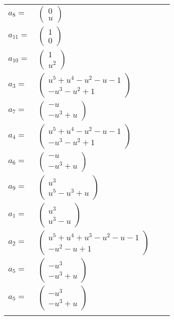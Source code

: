 \documentclass[1p]{elsarticle_modified}
\theoremstyle{definition}
\begin{document}
\begin{tabular}{m{7pt} m{180pt} m{7pt} m{180pt} }
\flushright $a_{8}=$&$\begin{pmatrix}0\\u\end{pmatrix}$ \\
\flushright $a_{11}=$&$\begin{pmatrix}1\\0\end{pmatrix}$ \\
\flushright $a_{10}=$&$\begin{pmatrix}1\\u^2\end{pmatrix}$ \\
\flushright $a_{3}=$&$\begin{pmatrix}u^5+u^4- u^2- u-1\\- u^3- u^2+1\end{pmatrix}$ \\
\flushright $a_{7}=$&$\begin{pmatrix}- u\\- u^3+u\end{pmatrix}$ \\
\flushright $a_{4}=$&$\begin{pmatrix}u^5+u^4- u^2- u-1\\- u^3- u^2+1\end{pmatrix}$ \\
\flushright $a_{6}=$&$\begin{pmatrix}- u\\- u^3+u\end{pmatrix}$ \\
\flushright $a_{9}=$&$\begin{pmatrix}u^3\\u^5- u^3+u\end{pmatrix}$ \\
\flushright $a_{1}=$&$\begin{pmatrix}u^3\\u^3- u\end{pmatrix}$ \\
\flushright $a_{2}=$&$\begin{pmatrix}u^5+u^4+u^3- u^2- u-1\\- u^2- u+1\end{pmatrix}$ \\
\flushright $a_{5}=$&$\begin{pmatrix}- u^3\\- u^3+u\end{pmatrix}$\\ \flushright $a_{5}=$&$\begin{pmatrix}- u^3\\- u^3+u\end{pmatrix}$\\&\end{tabular}
\end{document}
